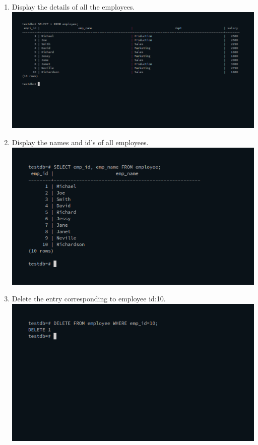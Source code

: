\documentclass[10pt,a4paper,titlepage]{report}
\begin{document}
{\begin{enumerate}
		\item Display the details of all the employees.\newline
			\includegraphics[width=\linewidth]{../Images/Basics/1.png}\newline
		\item Display the names and id’s of all employees.\newline
			\includegraphics[width=\linewidth]{../Images/Basics/2.png}\newline
		\item Delete the entry corresponding to employee id:10.\newline
			\includegraphics[width=\linewidth]{../Images/Basics/3.png}\newline

\end{enumerate}}
\end{document}
